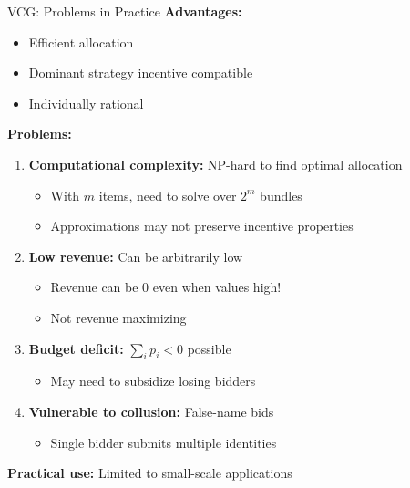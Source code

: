 \documentclass[xcolor={x11names}, aspectratio=169 ]{beamer}
\begin{document}
\begin{frame}{VCG: Problems in Practice}
\textbf{Advantages:}
\begin{itemize}
  \item Efficient allocation
  \item Dominant strategy incentive compatible
  \item Individually rational
\end{itemize}

\textbf{Problems:}
\begin{enumerate}
  \item \textbf{Computational complexity:} NP-hard to find optimal allocation
  \begin{itemize}
    \item With $m$ items, need to solve over $2^m$ bundles
    \item Approximations may not preserve incentive properties
  \end{itemize}
  
  \item \textbf{Low revenue:} Can be arbitrarily low
  \begin{itemize}
    \item Revenue can be 0 even when values high!
    \item Not revenue maximizing
  \end{itemize}
  
  \item \textbf{Budget deficit:} $\sum_i p_i < 0$ possible
  \begin{itemize}
    \item May need to subsidize losing bidders
  \end{itemize}
  
  \item \textbf{Vulnerable to collusion:} False-name bids
  \begin{itemize}
    \item Single bidder submits multiple identities
  \end{itemize}
\end{enumerate}

\textbf{Practical use:} Limited to small-scale applications
\end{frame}
\end{document}
